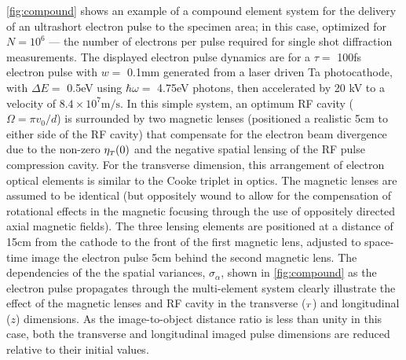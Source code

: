 
\ref{fig:compound} shows an example of a compound element system for the delivery of an ultrashort electron pulse to the specimen area; in this case, optimized for $ N = 10^{ 6 } $ --- the number of electrons per pulse required for single shot diffraction measurements.\cite{armstrong_practical_2007}
The displayed electron pulse dynamics are for a $\tau = $ 100fs electron pulse with $w = $ 0.1mm generated from a laser driven Ta photocathode, with $\Delta E = $ 0.5eV using $ \hbar \omega = $ 4.75eV photons, then accelerated by 20 kV to a velocity of $8.4 \times 10^{7} \text{m}/\text{s}$.
In this simple system, an optimum RF cavity ($ \Omega = \pi v_{{ \scriptscriptstyle 0}} / d $) is surrounded by two magnetic lenses (positioned a realistic 5cm to either side of the RF cavity) that compensate for the electron beam divergence due to the non-zero $ \eta_{{\scriptscriptstyle T}} (0) $ and the negative spatial lensing of the RF pulse compression cavity.
For the transverse dimension, this arrangement of electron optical elements is similar to the Cooke triplet in optics.
The magnetic lenses are assumed to be identical (but oppositely wound to allow for the compensation of rotational effects in the magnetic focusing through the use of oppositely directed axial magnetic fields).
The three lensing elements are positioned at a distance of 15cm from the cathode to the front of the first magnetic lens, adjusted to space-time image the electron pulse 5cm behind the second magnetic lens.
The dependencies of the the spatial variances, $\sigma_{\alpha}$, shown in \ref{fig:compound} as the electron pulse propagates through the multi-element system clearly illustrate the effect of the magnetic lenses and RF cavity in the transverse (${\scriptscriptstyle T}$) and longitudinal ($z$) dimensions.
As the image-to-object distance ratio is less than unity in this case, both the transverse and longitudinal imaged pulse dimensions are reduced relative to their initial values. %

